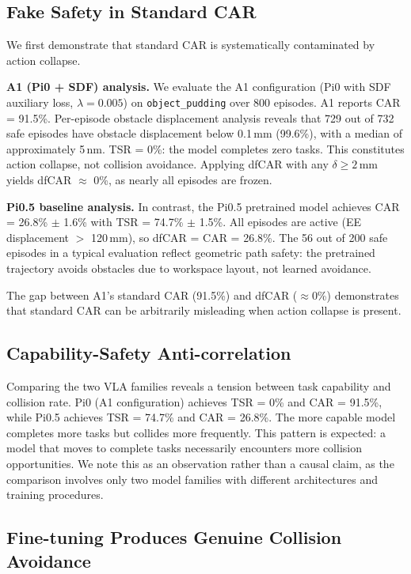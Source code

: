 \documentclass[10pt,letterpaper]{article}
\begin{document}
\subsection{Fake Safety in Standard CAR}
\label{sec:fake_safety}

We first demonstrate that standard CAR is systematically contaminated by action collapse.

\textbf{A1 (Pi0 + SDF) analysis.} We evaluate the A1 configuration (Pi0 with SDF auxiliary loss, $\lambda = 0.005$) on \texttt{object\_pudding} over 800 episodes. A1 reports CAR = 91.5\%. Per-episode obstacle displacement analysis reveals that 729 out of 732 safe episodes have obstacle displacement below 0.1\,mm (99.6\%), with a median of approximately 5\,nm. TSR = 0\%: the model completes zero tasks. This constitutes action collapse, not collision avoidance. Applying dfCAR with any $\delta \geq 2$\,mm yields dfCAR $\approx$ 0\%, as nearly all episodes are frozen.

\textbf{Pi0.5 baseline analysis.} In contrast, the Pi0.5 pretrained model achieves CAR = 26.8\% $\pm$ 1.6\% with TSR = 74.7\% $\pm$ 1.5\%. All episodes are active (EE displacement $>$ 120\,mm), so dfCAR = CAR = 26.8\%. The 56 out of 200 safe episodes in a typical evaluation reflect geometric path safety: the pretrained trajectory avoids obstacles due to workspace layout, not learned avoidance.

The gap between A1's standard CAR (91.5\%) and dfCAR ($\approx$0\%) demonstrates that standard CAR can be arbitrarily misleading when action collapse is present.

\subsection{Capability-Safety Anti-correlation}
\label{sec:cap_safety}

Comparing the two VLA families reveals a tension between task capability and collision rate. Pi0 (A1 configuration) achieves TSR = 0\% and CAR = 91.5\%, while Pi0.5 achieves TSR = 74.7\% and CAR = 26.8\%. The more capable model completes more tasks but collides more frequently. This pattern is expected: a model that moves to complete tasks necessarily encounters more collision opportunities. We note this as an observation rather than a causal claim, as the comparison involves only two model families with different architectures and training procedures.

\subsection{Fine-tuning Produces Genuine Collision Avoidance}
\label{sec:real_avoidance}
\end{document}
